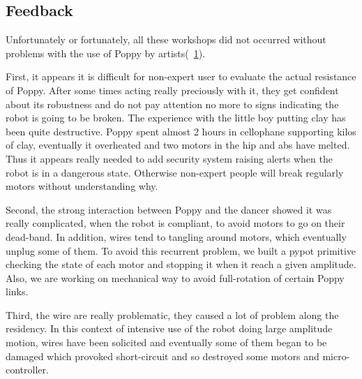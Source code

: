 \subsection{Feedback} %


Unfortunately or fortunately, all these workshops did not occurred without problems with the use of Poppy by artists(\figurename~\ref{fig:broken_poppy_residency}).

First, it appears it is difficult for non-expert user to evaluate the actual resistance of Poppy. After some times acting really preciously with it, they get confident about its robustness and do not pay attention no more to signs indicating the robot is going to be broken. The experience with the little boy putting clay has been quite destructive. Poppy spent almost 2 hours in cellophane supporting kilos of clay, eventually it overheated and two motors in the hip and abs have melted.
Thus it appears really needed to add security system raising alerts when the robot is in a dangerous state.  Otherwise non-expert people will break regularly motors without understanding why.

\begin{figure}[]
\centering
    \hfil
    \caption{}
    \label{fig:broken_poppy_residency}
\end{figure}

Second, the strong interaction between Poppy and the dancer showed it was really complicated, when the robot is compliant, to avoid motors to go on their dead-band. In addition, wires tend to tangling around motors, which eventually unplug some of them. To avoid this recurrent problem, we built a pypot primitive checking the state of each motor and stopping it when it reach a given amplitude. Also, we are working on mechanical way to avoid full-rotation of certain Poppy links.

Third, the wire are really problematic, they caused a lot of problem along the residency. In this context of intensive use of the robot doing large amplitude motion, wires have been solicited and eventually some of them began to be damaged which provoked short-circuit and so destroyed some motors and micro-controller.

